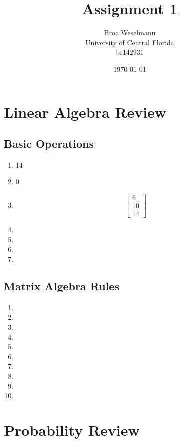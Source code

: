 \documentclass{article}
\begin{document}
\title{Assignment 1}

\author{Broc Weselmann\\
		University of Central Florida\\
		br142931}

\date{\today}
\maketitle

\section{Linear Algebra Review}

\subsection{Basic Operations}

\begin{enumerate}
\item 14
\item 0
\item $$
\left[
	\begin{array} { c }
	6 \\
	10 \\
	14
\end{array} \right]
      $$
\item
\item
\item
\item
\end{enumerate}

\subsection{Matrix Algebra Rules}

\begin{enumerate}
\item
\item
\item
\item
\item
\item
\item
\item
\item
\item
\end{enumerate}

\section{Probability Review}
\end{document}
